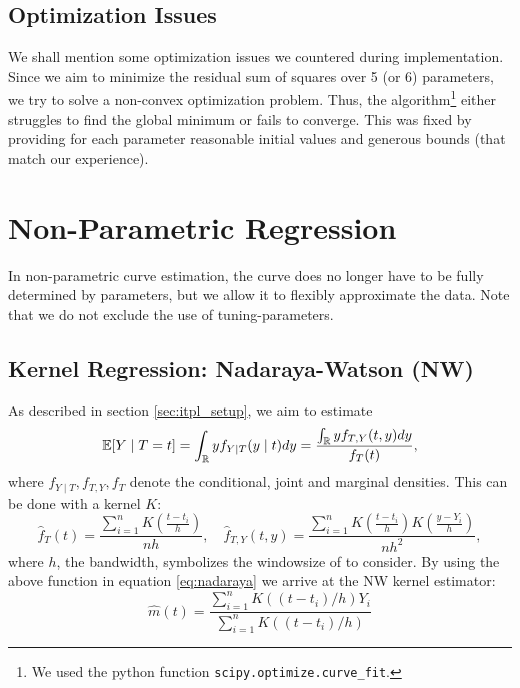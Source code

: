 	\subsection{Optimization Issues}\label{sec:itpl_param_optimizationissues}
		We shall mention some optimization issues we countered during implementation. Since we aim to minimize the residual sum of squares over 5 (or 6) parameters, we try to solve a non-convex optimization problem. Thus, the algorithm\footnote{We used the python function \texttt{scipy.optimize.curve\_fit}.} either struggles to find the global minimum or fails to converge. This was fixed by providing for each parameter reasonable initial values and generous bounds (that match our experience).

\section{Non-Parametric Regression}
	\label{sec:itpl_nonparametric}
	In non-parametric curve estimation, the curve does no longer have to be fully determined by parameters, but we allow it to flexibly approximate the data. Note that we do not exclude the use of tuning-parameters.

	\subsection{Kernel Regression: Nadaraya-Watson (NW)}
		\label{sec:Kernel}
		As described in section \ref{sec:itpl_setup}, we aim to estimate
		\begin{equation}
			\label{eq:nadaraya}
			\mathbb{E}[Y \mid T=t]
			= \int_{\mathbb{R}} y f_{Y \mid T}(y \mid t) d y
			=\frac{\int_{\mathbb{R}} y f_{T, Y}(t, y) d y}{f_{T}(t)},
		\end{equation}
		where $f_{Y \mid T}, f_{T, Y}, f_{T}$ denote the conditional, joint and marginal densities.
		This can be done with a kernel $K$:
		\begin{equation}
			\hat{f}_{T}(t)=\frac{\sum_{i=1}^{n} K\left(\frac{t-t_{i}}{h}\right)}{n h}, \quad \hat{f}_{T, Y}(t, y)=\frac{\sum_{i=1}^{n} K\left(\frac{t-t_{i}}{h}\right) K\left(\frac{y-Y_{i}}{h}\right)}{n h^{2}},
			\label{eq:kernel_with_bandwidt}
		\end{equation}
		where $h$, the bandwidth, symbolizes the windowsize of to consider. By using the above function in equation \eqref{eq:nadaraya} we arrive at the NW kernel estimator:
		$$\hat{m}(t)=\frac{\sum_{i=1}^{n} K\left(\left(t-t_{i}\right) / h\right) Y_{i}}{\sum_{i=1}^{n} K\left(\left(t-t_{i}\right) / h\right)}$$

